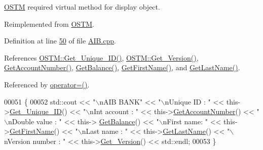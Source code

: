 \hyperlink{class_o_s_t_m}{O\+S\+TM} required virtual method for display object. 



Reimplemented from \hyperlink{class_o_s_t_m_a513396a115f2987fd07c203309ae8a59_a513396a115f2987fd07c203309ae8a59}{O\+S\+TM}.



Definition at line \hyperlink{_a_i_b_8cpp_source_l00050}{50} of file \hyperlink{_a_i_b_8cpp_source}{A\+I\+B.\+cpp}.



References \hyperlink{_o_s_t_m_8cpp_source_l00073}{O\+S\+T\+M\+::\+Get\+\_\+\+Unique\+\_\+\+I\+D()}, \hyperlink{_o_s_t_m_8cpp_source_l00089}{O\+S\+T\+M\+::\+Get\+\_\+\+Version()}, \hyperlink{_a_i_b_8cpp_source_l00075}{Get\+Account\+Number()}, \hyperlink{_a_i_b_8cpp_source_l00067}{Get\+Balance()}, \hyperlink{_a_i_b_8cpp_source_l00091}{Get\+First\+Name()}, and \hyperlink{_a_i_b_8cpp_source_l00083}{Get\+Last\+Name()}.



Referenced by \hyperlink{_a_i_b_8h_source_l00066}{operator=()}.


\begin{DoxyCode}
00051 \{
00052     std::cout << \textcolor{stringliteral}{"\(\backslash\)nAIB BANK"} << \textcolor{stringliteral}{"\(\backslash\)nUnique ID : "} << this->\hyperlink{class_o_s_t_m_a5a01a8b98d16b1d1904ecf9356e7b71d_a5a01a8b98d16b1d1904ecf9356e7b71d}{Get\_Unique\_ID}() << \textcolor{stringliteral}{"\(\backslash\)nInt account :
       "} << this->\hyperlink{class_a_i_b_aef34bfbf20d767114e05b8b532cab777_aef34bfbf20d767114e05b8b532cab777}{GetAccountNumber}() << \textcolor{stringliteral}{"\(\backslash\)nDouble value : "} << this->
      \hyperlink{class_a_i_b_ac75087ae73c308bd946e47a71dc85b86_ac75087ae73c308bd946e47a71dc85b86}{GetBalance}() << \textcolor{stringliteral}{"\(\backslash\)nFirst name: "} << this->\hyperlink{class_a_i_b_aa0833919c1c211481560cd88cb5b381b_aa0833919c1c211481560cd88cb5b381b}{GetFirstName}() << \textcolor{stringliteral}{"\(\backslash\)nLast name : "} << 
      this->\hyperlink{class_a_i_b_a1b09db7268734beeaf6a9e7e9d8feb02_a1b09db7268734beeaf6a9e7e9d8feb02}{GetLastName}()  << \textcolor{stringliteral}{"\(\backslash\)nVersion number : "} << this->\hyperlink{class_o_s_t_m_a1f1db9d482f22c8e7caa17dfb340626b_a1f1db9d482f22c8e7caa17dfb340626b}{Get\_Version}() << std::endl;
00053 \}
\end{DoxyCode}


